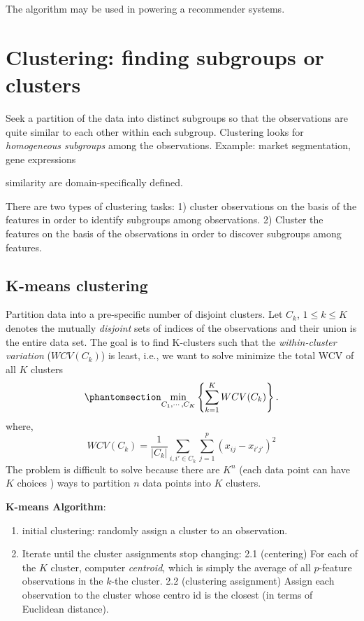 \documentclass[
  letterpaper,
  DIV=11,
  numbers=noendperiod]{scrreprt}
\providecommand{\tightlist}{%
  \setlength{\itemsep}{0pt}\setlength{\parskip}{0pt}}\usepackage{longtable,booktabs,array}
\begin{document}
The algorithm may be used in powering a recommender systems.

\section{Clustering: finding subgroups or
clusters}\label{clustering-finding-subgroups-or-clusters}

Seek a partition of the data into distinct subgroups so that the
observations are quite similar to each other within each subgroup.
Clustering looks for \emph{homogeneous subgroups} among the
observations. Example: market segmentation, gene expressions

similarity are domain-specifically defined.

There are two types of clustering tasks: 1) cluster observations on the
basis of the features in order to identify subgroups among observations.
2) Cluster the features on the basis of the observations in order to
discover subgroups among features.

\subsection{K-means clustering}\label{k-means-clustering}

Partition data into a pre-specific number of disjoint clusters. Let
\(C_k\), \(1\le k \le K\) denotes the mutually \emph{disjoint} sets of
indices of the observations and their union is the entire data set. The
goal is to find K-clusters such that the \emph{within-cluster variation}
(\(WCV(C_k)\)) is least, i.e., we want to solve minimize the total WCV
of all \(K\) clusters
\begin{equation}\phantomsection\label{eq-clustering-var}{
\min_{C_1, \cdots, C_K} \left\{ \sum_{k=1}^K WCV(C_k) \right\}.
}\end{equation} where, \[
WCV(C_k)=\frac{1}{|C_k|}\sum_{i,i'\in C_k}\sum_{j=1}^p(x_{ij}-x_{i'j'})^2
\] The problem is difficult to solve because there are \(K^n\) (each
data point can have \(K\) choices ) ways to partition \(n\) data points
into \(K\) clusters.

\textbf{K-means Algorithm}:

\begin{enumerate}
\def\labelenumi{\arabic{enumi}.}
\tightlist
\item
  initial clustering: randomly assign a cluster to an observation.
\item
  Iterate until the cluster assignments stop changing: 2.1 (centering)
  For each of the \(K\) cluster, computer \emph{centroid}, which is
  simply the average of all \(p\)-feature observations in the \(k\)-the
  cluster. 2.2 (clustering assignment) Assign each observation to the
  cluster whose centro id is the closest (in terms of Euclidean
  distance).
\end{enumerate}
\end{document}
